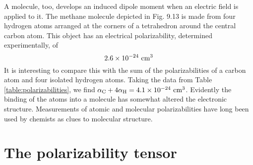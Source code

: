 A molecule, too, develops an induced dipole moment when an
electric field is applied to it. The methane molecule depicted in
Fig. 9.13 is made from four hydrogen atoms arranged at the corners
of a tetrahedron around the central carbon atom. This object has
an electrical polarizability, determined experimentally, of
\begin{equation*}
  2.6\times 10^{-24}\ \textup{cm}^3
\end{equation*}
It is interesting to compare this with the sum of the polarizabilities of
a carbon atom and four isolated hydrogen atoms. Taking the data
from Table \ref{table:polarizabilities}, we find 
$\alpha_{\textup{C}}+4\alpha_{\textup{H}} = 4.1 \times 10^{-24}\ \textup{cm}^3$. Evidently
the binding of the atoms into a molecule has somewhat altered the
electronic structure. Measurements of atomic and molecular 
polarizabilities have long been used by chemists as clues to molecular
structure.

\section{The polarizability tensor}

